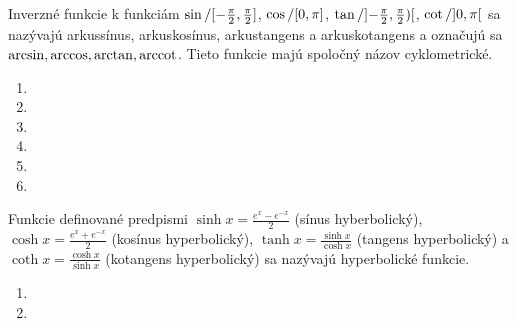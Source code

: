 Inverzné funkcie k funkciám
$\sin / \interval{-\frac{\pi}{2}}{\frac{\pi}{2}}$,
$\cos / \interval{0}{\pi}$,
$\tan / \interval[open]{-\frac{\pi}{2}}{\frac{\pi}{2})}$,
$\cot / \interval[open]{0}{\pi}$
sa nazývajú arkussínus, arkuskosínus, arkustangens a arkuskotangens a označujú
sa $\arcsin, \arccos, \arctan, \operatorname{arccot}$. Tieto funkcie majú spoločný názov
cyklometrické.

\begin{enumerate}[resume]
  \item {}
  \item {}
  \item {}
  \showanswers
  \item {}
  \item {}
  \hideanswers
  \item {}
\end{enumerate}

Funkcie definované predpismi
$\sinh x=\frac{e^x-e^{-x}}{2}$ (sínus hyberbolický),
$\cosh x=\frac{e^x+e^{-x}}{2}$ (kosínus hyperbolický),
$\tanh x=\frac{\sinh x}{\cosh x}$ (tangens hyperbolický) a
$\coth x=\frac{\cosh x}{\sinh x}$ (kotangens hyperbolický) sa
nazývajú hyperbolické funkcie.

\begin{enumerate}[resume]
  \item {}
  \item {}
\end{enumerate}
